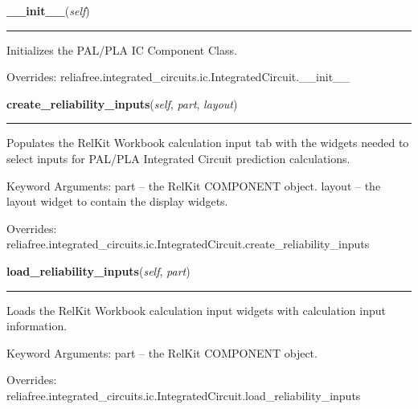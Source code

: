 \hspace{.8\funcindent}\begin{boxedminipage}{\funcwidth}

    \raggedright \textbf{\_\_init\_\_}(\textit{self})

    \vspace{-1.5ex}

    \rule{\textwidth}{0.5\fboxrule}
\setlength{\parskip}{2ex}
    Initializes the PAL/PLA IC Component Class.

\setlength{\parskip}{1ex}
      Overrides: reliafree.integrated\_circuits.ic.IntegratedCircuit.\_\_init\_\_

    \end{boxedminipage}

    \vspace{0.5ex}

\hspace{.8\funcindent}\begin{boxedminipage}{\funcwidth}

    \raggedright \textbf{create\_reliability\_inputs}(\textit{self}, \textit{part}, \textit{layout})

    \vspace{-1.5ex}

    \rule{\textwidth}{0.5\fboxrule}
\setlength{\parskip}{2ex}
    Populates the RelKit Workbook calculation input tab with the widgets
    needed to select inputs for PAL/PLA Integrated Circuit prediction 
    calculations.

    Keyword Arguments: part   -- the RelKit COMPONENT object. layout -- 
    the layout widget to contain the display widgets.

\setlength{\parskip}{1ex}
      Overrides: reliafree.integrated\_circuits.ic.IntegratedCircuit.create\_reliability\_inputs

    \end{boxedminipage}

    \vspace{0.5ex}

\hspace{.8\funcindent}\begin{boxedminipage}{\funcwidth}

    \raggedright \textbf{load\_reliability\_inputs}(\textit{self}, \textit{part})

    \vspace{-1.5ex}

    \rule{\textwidth}{0.5\fboxrule}
\setlength{\parskip}{2ex}
    Loads the RelKit Workbook calculation input widgets with calculation
    input information.

    Keyword Arguments: part -- the RelKit COMPONENT object.

\setlength{\parskip}{1ex}
      Overrides: reliafree.integrated\_circuits.ic.IntegratedCircuit.load\_reliability\_inputs

    \end{boxedminipage}

